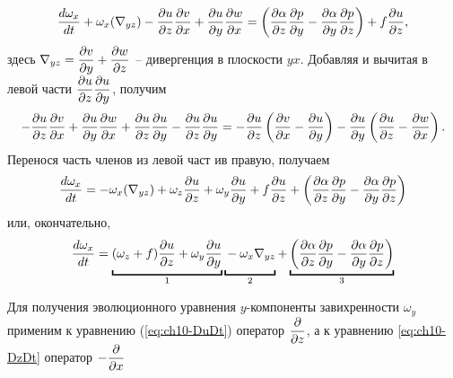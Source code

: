\begin{equation*}
    \td{\omega_x}{t}+\omega_x(\nabla_{yz})-\pd{u}{z}\pd{v}{x}+\pd{u}{y}\pd{w}{x} = \left( \pd{\alpha}{z}\pd{p}{y} - \pd{\alpha}{y}\pd{p}{z} \right) + f\pd{u}{z},
\end{equation*}
здесь $\nabla_{yz} = \pd{v}{y} +\pd{w}{z}$ -- дивергенция в плоскости $yx$. 
Добавляя и вычитая в левой части $\pd{u}{z}\pd{u}{y}$, получим
\begin{equation*}
    -\pd{u}{z}\pd{v}{x}+\pd{u}{y}\pd{w}{x}+\pd{u}{z}\pd{u}{y}-\pd{u}{z}\pd{u}{y} = -\pd{u}{z} \left( \pd{v}{x}-\pd{u}{y} \right) - \pd{u}{y} \left( \pd{u}{z} - \pd{w}{x} \right).
\end{equation*}
Перенося часть членов из левой част ив правую, получаем
\begin{equation*}
    \td{\omega_x}{t} = -\omega_x(\nabla_{yz}) + \omega_z\pd{u}{z}+\omega_y\pd{u}{y}+f\pd{u}{z}+ \left( \pd{\alpha}{z}\pd{p}{y} - \pd{\alpha}{y}\pd{p}{z} \right)
\end{equation*}
или, окончательно,
\begin{equation}
\label{eq:ch10_omegax}
    \td{\omega_x}{t}=
    \ub{\vphantom{\left( \pd{a}{z}\pd{p}{y} \right)}(\omega_z+f)\pd{u}{z} + \omega_y\pd{u}{y}}_{1}
    \ub{\vphantom{\left( \pd{a}{z}\pd{p}{y} \right)}-\omega_x\nabla_{yz}}_{2}+
    \ub{\left( \pd{\alpha}{z}\pd{p}{y} - \pd{\alpha}{y}\pd{p}{z} \right)}_{3}
\end{equation}

Для получения эволюционного уравнения $y$-компоненты завихренности $\omega_y$ применим к уравнению (\ref{eq:ch10-DuDt}) оператор $\pd{}{z}$, а к уравнению \ref{eq:ch10-DzDt} оператор $-\pd{}{x}$

